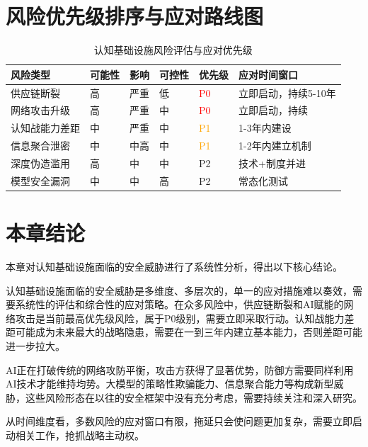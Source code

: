 \section{风险优先级排序与应对路线图}

\begin{table}[H]
\centering
\caption{认知基础设施风险评估与应对优先级}
\small
\begin{tabular}{p{2.5cm}p{1.2cm}p{1.2cm}p{1.2cm}p{1.5cm}p{3.5cm}}
\toprule
\textbf{风险类型} & \textbf{可能性} & \textbf{影响} & \textbf{可控性} & \textbf{优先级} & \textbf{应对时间窗口} \\
\midrule
供应链断裂 & 高 & 严重 & 低 & \textcolor{red}{P0} & 立即启动，持续5-10年 \\
网络攻击升级 & 高 & 严重 & 中 & \textcolor{red}{P0} & 立即启动，持续 \\
认知战能力差距 & 中 & 严重 & 中 & \textcolor{orange}{P1} & 1-3年内建设 \\
信息聚合泄密 & 中 & 中高 & 中 & \textcolor{orange}{P1} & 1-2年内建立机制 \\
深度伪造滥用 & 高 & 中 & 中 & P2 & 技术+制度并进 \\
模型安全漏洞 & 中 & 中 & 高 & P2 & 常态化测试 \\
\bottomrule
\end{tabular}
\end{table}

\section{本章结论}

本章对认知基础设施面临的安全威胁进行了系统性分析，得出以下核心结论。

认知基础设施面临的安全威胁是多维度、多层次的，单一的应对措施难以奏效，需要系统性的评估和综合性的应对策略。在众多风险中，供应链断裂和AI赋能的网络攻击是当前最高优先级风险，属于P0级别，需要立即采取行动。认知战能力差距可能成为未来最大的战略隐患，需要在一到三年内建立基本能力，否则差距可能进一步拉大。

AI正在打破传统的网络攻防平衡，攻击方获得了显著优势，防御方需要同样利用AI技术才能维持均势。大模型的策略性欺骗能力、信息聚合能力等构成新型威胁，这些风险形态在以往的安全框架中没有充分考虑，需要持续关注和深入研究。

从时间维度看，多数风险的应对窗口有限，拖延只会使问题更加复杂，需要立即启动相关工作，抢抓战略主动权。

